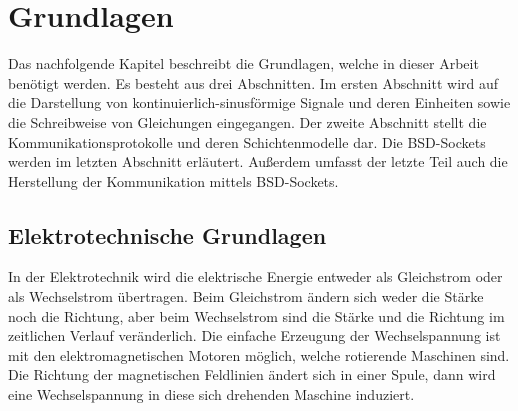 \chapter{Grundlagen}

Das nachfolgende Kapitel beschreibt die Grundlagen, welche in dieser Arbeit benötigt werden. Es besteht aus drei Abschnitten. Im ersten Abschnitt wird auf die Darstellung von kontinuierlich-sinusförmige Signale und deren Einheiten sowie die Schreibweise von Gleichungen eingegangen. Der zweite Abschnitt stellt die Kommunikationsprotokolle und deren Schichtenmodelle dar. Die BSD-Sockets werden im letzten Abschnitt erläutert. Außerdem umfasst der letzte Teil auch die Herstellung der Kommunikation mittels BSD-Sockets.

\section{Elektrotechnische Grundlagen}
In der Elektrotechnik wird die elektrische Energie entweder als Gleichstrom oder als Wechselstrom übertragen. Beim Gleichstrom ändern sich weder die Stärke noch die Richtung, aber beim Wechselstrom sind die Stärke und die Richtung im zeitlichen Verlauf veränderlich. Die einfache Erzeugung der Wechselspannung ist mit den elektromagnetischen Motoren möglich, welche rotierende Maschinen sind. Die Richtung der magnetischen Feldlinien ändert sich in einer Spule, dann wird eine Wechselspannung in diese sich drehenden Maschine induziert. \smallskip \smallskip

